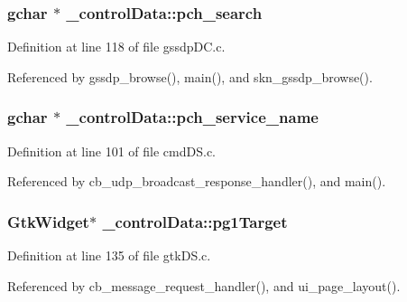 \subsubsection[{pch\+\_\+search}]{\setlength{\rightskip}{0pt plus 5cm}gchar $\ast$ \+\_\+control\+Data\+::pch\+\_\+search}\label{struct__control_data_aae1d10aba11260e77341d9f5fa6055e2}


Definition at line 118 of file gssdp\+D\+C.\+c.



Referenced by gssdp\+\_\+browse(), main(), and skn\+\_\+gssdp\+\_\+browse().

\hypertarget{struct__control_data_a2197fd3d9315510193866dbedbd3cc8b}{}
\subsubsection[{pch\+\_\+service\+\_\+name}]{\setlength{\rightskip}{0pt plus 5cm}gchar $\ast$ \+\_\+control\+Data\+::pch\+\_\+service\+\_\+name}\label{struct__control_data_a2197fd3d9315510193866dbedbd3cc8b}


Definition at line 101 of file cmd\+D\+S.\+c.



Referenced by cb\+\_\+udp\+\_\+broadcast\+\_\+response\+\_\+handler(), and main().

\hypertarget{struct__control_data_adb6c2830054c6309779d676082e94447}{}
\subsubsection[{pg1\+Target}]{\setlength{\rightskip}{0pt plus 5cm}Gtk\+Widget$\ast$ \+\_\+control\+Data\+::pg1\+Target}\label{struct__control_data_adb6c2830054c6309779d676082e94447}


Definition at line 135 of file gtk\+D\+S.\+c.



Referenced by cb\+\_\+message\+\_\+request\+\_\+handler(), and ui\+\_\+page\+\_\+layout().

\hypertarget{struct__control_data_a201f826ab99699df83a85c5e4572ffb2}{}
